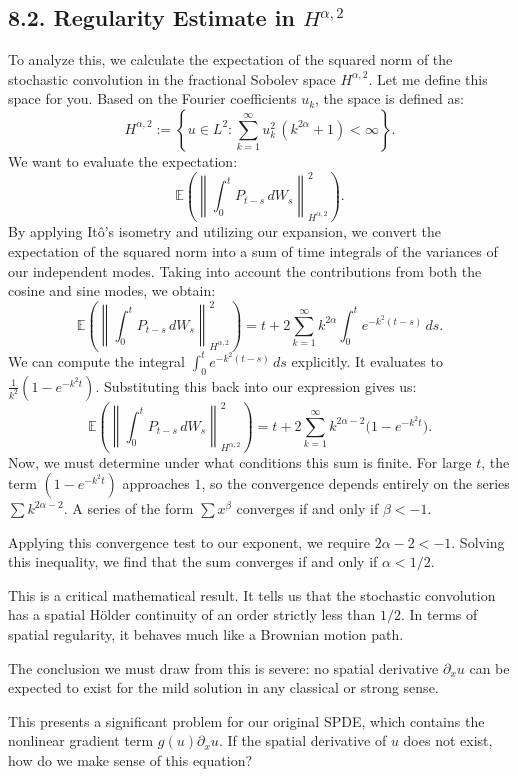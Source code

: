 \documentclass[11pt]{article}
\theoremstyle{definition}
\theoremstyle{remark}
\begin{document}
\subsection*{8.2. Regularity Estimate in $H^{\alpha,2}$}
To analyze this, we calculate the expectation of the squared norm of the stochastic convolution in the fractional Sobolev space $H^{\alpha,2}$. Let me define this space for you. Based on the Fourier coefficients $u_k$, the space is defined as:
\[
H^{\alpha,2}
:=
\left\{
u\in L^2:
\sum_{k=1}^{\infty}u_k^2\,(k^{2\alpha}+1)<\infty
\right\}.
\]
We want to evaluate the expectation:
\[
\mathbb E\!\left(
\left\|
\int_0^t P_{t-s}\,dW_s
\right\|_{H^{\alpha,2}}^2
\right).
\]
By applying It\^o's isometry and utilizing our expansion, we convert the expectation of the squared norm into a sum of time integrals of the variances of our independent modes. Taking into account the contributions from both the cosine and sine modes, we obtain:
\[
\mathbb E\!\left(
\left\|
\int_0^t P_{t-s}\,dW_s
\right\|_{H^{\alpha,2}}^2
\right)
=
t+2\sum_{k=1}^{\infty}k^{2\alpha}\int_0^t e^{-k^2(t-s)}\,ds.
\]
We can compute the integral $\int_0^t e^{-k^2(t-s)}\,ds$ explicitly. It evaluates to $\frac{1}{k^2}(1-e^{-k^2t})$. Substituting this back into our expression gives us:
\[
\mathbb E\!\left(
\left\|
\int_0^t P_{t-s}\,dW_s
\right\|_{H^{\alpha,2}}^2
\right)
=
t+2\sum_{k=1}^{\infty}k^{2\alpha-2}\bigl(1-e^{-k^2t}\bigr).
\]
Now, we must determine under what conditions this sum is finite. For large $t$, the term $(1-e^{-k^2t})$ approaches $1$, so the convergence depends entirely on the series $\sum k^{2\alpha-2}$. A series of the form $\sum x^\beta$ converges if and only if $\beta<-1$.

Applying this convergence test to our exponent, we require $2\alpha-2<-1$. Solving this inequality, we find that the sum converges if and only if $\alpha<1/2$.

This is a critical mathematical result. It tells us that the stochastic convolution has a spatial H\"older continuity of an order strictly less than $1/2$. In terms of spatial regularity, it behaves much like a Brownian motion path.

The conclusion we must draw from this is severe: no spatial derivative $\partial_xu$ can be expected to exist for the mild solution in any classical or strong sense.

This presents a significant problem for our original SPDE, which contains the nonlinear gradient term $g(u)\partial_xu$. If the spatial derivative of $u$ does not exist, how do we make sense of this equation?
\end{document}
